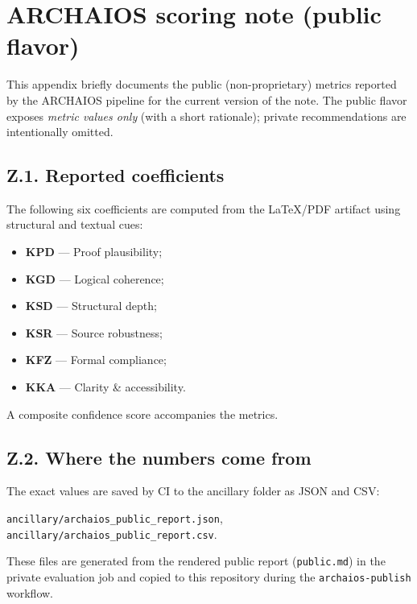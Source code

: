 \section{ARCHAIOS scoring note (public flavor)}
\label{app:archaios}

This appendix briefly documents the public (non-proprietary) metrics
reported by the ARCHAIOS pipeline for the current version of the note.
The public flavor exposes \emph{metric values only}
(with a short rationale); private recommendations are intentionally omitted.

\subsection*{Z.1. Reported coefficients}
The following six coefficients are computed from the LaTeX/PDF artifact
using structural and textual cues:
\begin{itemize}
  \item \textbf{KPD} — Proof plausibility;
  \item \textbf{KGD} — Logical coherence;
  \item \textbf{KSD} — Structural depth;
  \item \textbf{KSR} — Source robustness;
  \item \textbf{KFZ} — Formal compliance;
  \item \textbf{KKA} — Clarity \& accessibility.
\end{itemize}
A composite confidence score accompanies the metrics.

\subsection*{Z.2. Where the numbers come from}
The exact values are saved by CI to the ancillary folder as JSON and CSV:
\begin{center}
  \texttt{ancillary/archaios\_public\_report.json},\quad
  \texttt{ancillary/archaios\_public\_report.csv}.
\end{center}
These files are generated from the rendered public report (\texttt{public.md})
in the private evaluation job and copied to this repository during the
\texttt{archaios-publish} workflow.

